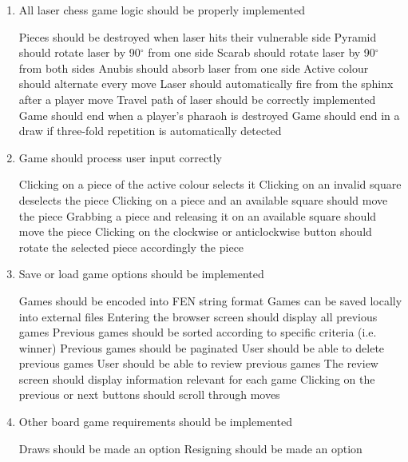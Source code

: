 \documentclass[../main/main.tex]{subfiles}
\begin{document}
\begin{enumerate}
\item All laser chess game logic should be properly implemented
    \begin{enumerate}
    \objitem Pieces should be destroyed when laser hits their vulnerable side
    \objitem Pyramid should rotate laser by 90$^{\circ}$ from one side
    \objitem Scarab should rotate laser by 90$^{\circ}$ from both sides
    \objitem Anubis should absorb laser from one side
    \objitem Active colour should alternate every move
    \objitem Laser should automatically fire from the sphinx after a player move
    \objitem Travel path of laser should be correctly implemented
    \objitem Game should end when a player's pharaoh is destroyed
    \objitem Game should end in a draw if three-fold repetition is automatically detected
    \end{enumerate}
\item Game should process user input correctly
    \begin{enumerate}
    \objitem Clicking on a piece of the active colour selects it
    \objitem Clicking on an invalid square deselects the piece
    \objitem Clicking on a piece and an available square should move the piece
    \objitem Grabbing a piece and releasing it on an available square should move the piece
    \objitem Clicking on the clockwise or anticlockwise button should rotate the selected piece accordingly the piece
    \end{enumerate}
\item Save or load game options should be implemented
\label{itm:save-games}
    \begin{enumerate}
    \objitem Games should be encoded into FEN string format
    \objitem Games can be saved locally into external files
    \objitem Entering the browser screen should display all previous games
    \objitem Previous games should be sorted according to specific criteria (i.e. winner)
    \objitem Previous games should be paginated
    \objitem User should be able to delete previous games
    \objitem User should be able to review previous games
    \objitem The review screen should display information relevant for each game
    \objitem Clicking on the previous or next buttons should scroll through moves
    \end{enumerate}
\item Other board game requirements should be implemented
    \begin{enumerate}
    \objitem Draws should be made an option
    \objitem Resigning should be made an option

\end{enumerate}
\end{enumerate}
\end{document}
